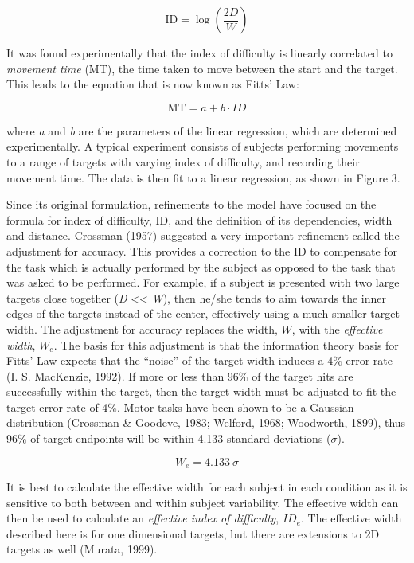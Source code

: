 \begin{equation}
    \mathrm{ID} = \log\left(\frac{2D}{W}\right)
\end{equation}

It was found experimentally that the index of difficulty is linearly correlated to \emph{movement time} (MT), the time taken to move between the start and the target. This leads to the equation that is now known as Fitts' Law:

\begin{equation}
    \mathrm{MT} = a + b \cdot ID
\end{equation}

where \emph{a} and \emph{b} are the parameters of the linear regression, which are determined experimentally. A typical experiment consists of subjects performing movements to a range of targets with varying index of difficulty, and recording their movement time. The data is then fit to a linear regression, as shown in Figure 3.

Since its original formulation, refinements to the model have focused on the formula for index of difficulty, \(\text{ID}\), and the definition of its dependencies, width and distance. Crossman (1957) suggested a very important refinement called the adjustment for accuracy. This provides a correction to the \(\text{ID}\) to compensate for the task which is actually performed by the subject as opposed to the task that was asked to be performed. For example, if a subject is presented with two large targets close together (\emph{D} \textless{}\textless{} \emph{W}), then he/she tends to aim towards the inner edges of the targets instead of the center, effectively using a much smaller target width. The adjustment for accuracy replaces the width, \(W\), with the \emph{effective width}, \(W_{e}\). The basis for this adjustment is that the information theory basis for Fitts' Law expects that the ``noise'' of the target width induces a 4\% error rate (I. S. MacKenzie, 1992). If more or less than 96\% of the target hits are successfully within the target, then the target width must be adjusted to fit the target error rate of 4\%. Motor tasks have been shown to be a Gaussian distribution (Crossman \& Goodeve, 1983; Welford, 1968; Woodworth, 1899), thus 96\% of target endpoints will be within 4.133 standard deviations
(\(\sigma\)).


\[W_{e} = 4.133\ \sigma\]

It is best to calculate the effective width for each subject in each condition as it is sensitive to both between and within subject variability. The effective width can then be used to calculate an \emph{effective index of difficulty}, \(ID_{e}\). The effective width described here is for one dimensional targets, but there are extensions to 2D targets as well (Murata, 1999).


